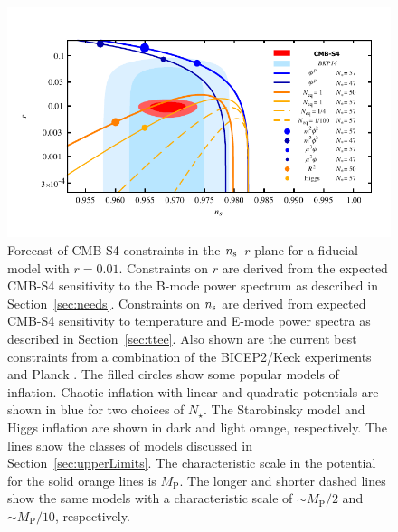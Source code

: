 \begin{figure}[ht]
\centering
\includegraphics[width=6in]{Inflation/nsrlabeledrp01v3}
\caption{Forecast of CMB-S4 constraints in the $n_{\rm s}$--$r$ plane for a fiducial model with $r=0.01$. Constraints 
on $r$ are derived from the expected CMB-S4 sensitivity to the B-mode power spectrum as described in 
Section~\ref{sec:needs}. Constraints on $n_{\rm s}$ are derived from expected CMB-S4 sensitivity to temperature and 
E-mode power spectra as described in Section~\ref{sec:ttee}. Also shown are the current best constraints from a combination of the BICEP2/Keck experiments and Planck \cite{Ade:2015fwj}. The filled circles show some popular models of inflation. Chaotic inflation with linear and quadratic potentials are shown in blue for two choices of $N_\star$. The Starobinsky model and Higgs inflation are shown in dark and light orange, respectively. The lines show the classes of models discussed in Section~\ref{sec:upperLimits}. The characteristic scale in the potential for the solid orange lines is $M_\text{P}$. The longer and shorter dashed lines show the same models with a characteristic scale of $\sim M_\text{P}/2$ and $\sim M_\text{P}/10$, respectively.
}
\label{fig:nsrp01}
\end{figure}
 

